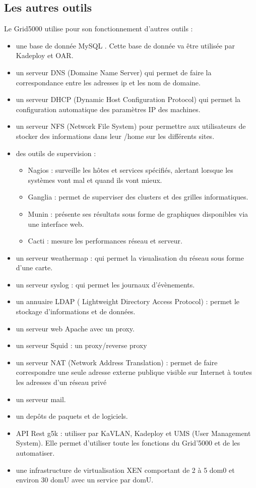 \documentclass[a4paper, 10pt, onecolumn]{report}
\begin{document}
		\subsection{Les autres outils}
			Le Grid5000 utilise pour son fonctionnement d'autres outils :
				\begin{itemize}
					\item une base de donnée MySQL . Cette base de donnée va \^etre utilisée par Kadeploy et OAR.
					\item un serveur DNS (Domaine Name Server) qui permet de faire la correspondance entre les adresses ip et les nom de domaine.			
					\item un serveur DHCP (Dynamic Host Configuration Protocol) qui permet la configuration automatique des paramètres IP des machines.
					\item un serveur NFS (Network File System) pour permettre aux utilisateurs de stocker des informations dans leur /home sur les
 différents sites.
 					\item des  outils de supervision : \begin{itemize}
 															\item 	Nagios : surveille les hôtes et services spécifiés, alertant lorsque les systèmes vont mal et quand ils vont mieux.
 															\item 	Ganglia : permet de superviser des clusters et des grilles informatiques. 
 															\item 	Munin : présente ses résultats sous forme de graphiques disponibles via une interface web.
 															\item 	Cacti : mesure les performances réseau et serveur.
 														\end{itemize}
 					\item un serveur weathermap : qui permet la visualisation du réseau sous forme d'une carte.
 					\item un serveur syslog : qui permet les journaux d'évènements.
 					\item un annuaire LDAP ( Lightweight Directory Access Protocol) : permet le stockage d'informations et de données.
 					\item un serveur web Apache avec un proxy.
 					\item un serveur Squid :  un proxy/reverse proxy
 					\item un serveur NAT (Network Address Translation) : permet de faire correspondre une seule adresse externe publique visible sur Internet à toutes les adresses d'un réseau privé
 					\item un serveur mail.
 					\item un dep\^ots de paquets et de logiciels.
 					\item API Rest g5k : utiliser par KaVLAN, Kadeploy et UMS (User Management System). Elle permet d'utiliser toute les fonctions du Grid'5000 et de les automatiser.
 					\item une infrastructure de virtualisation XEN comportant de 2 à 5 dom0 et environ 30 domU avec un service par domU.
 					
				\end{itemize}
	
\end{document}
